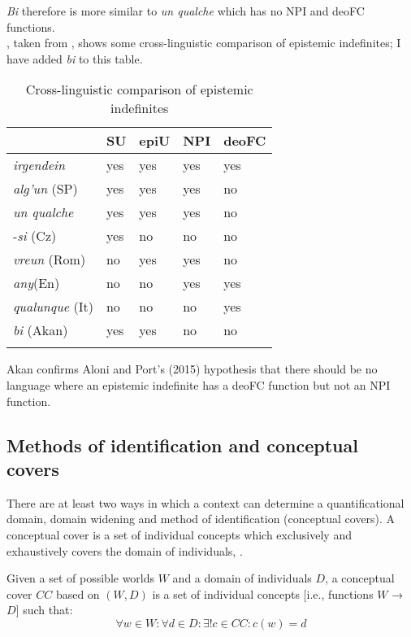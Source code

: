\documentclass[output=paper,modfonts,nonflat,draftmode]{langsci/langscibook}
\begin{document}
\emph{Bi} therefore is more similar to \emph{un qualche} which has no NPI and deoFC functions. \\
 , taken from \citet{AloniPort2015}, shows some cross-linguistic comparison of epistemic indefinites; I have added \emph{bi} to this table.\\

\begin{table}
\caption{Cross-linguistic comparison of epistemic indefinites}
	\begin{tabularx}{.8\textwidth}{lXXXX}
		\lsptoprule
		{}		& SU		& 	epiU & NPI & deoFC \\ 
		\midrule 
		\emph{irgendein} 			& yes 		& 	yes	& 	yes	& 	yes	\\ 
		\emph{alg'un} (SP)        & yes 	 	& 	yes 	& 	yes & 	no		\\ 
		 \emph{un qualche} 		& yes 	 	& 	yes 	& 	yes & 	no \\		
		-\emph{si} (Cz)	& 	yes	& 	no &	 no & no			\\ 
		\emph{vreun} (Rom) 		& no	 	& 	yes 	& 	yes & 	no \\			
		\emph{any}(En) 		& no 	 	& 	no 	& 	yes & 	yes \\			
		\emph{qualunque} (It)		& no	 	& 	no 	& 	no & 	yes \\		
		\emph{bi} (Akan) 		& yes 	 	& 	yes 	& 	no & 	no \\		
		\lspbottomrule
	\end{tabularx}
	\label{tab:owusu:1}
    \end{table}
    
Akan confirms Aloni and Port's (2015) hypothesis that there should be no language where an epistemic indefinite has a deoFC function but not an NPI function. 

\subsection{Methods of identification and conceptual covers}
There are at least two ways in which a context can determine a quantificational domain, domain widening and method of identification (conceptual covers). 
A conceptual cover is a set of individual concepts which exclusively and exhaustively covers the domain of individuals, \citep{Aloni2001}.

\ea{} Given a set of possible worlds $W$ and a domain of individuals $D$, a conceptual cover $CC$ based on $(W, D)$ is a set of individual concepts [i.e., functions $W$ → $D$] such that: 
\[ \forall w \in W: \forall d \in D: \exists!c \in CC : c(w)=d \]
\z
\end{document}
